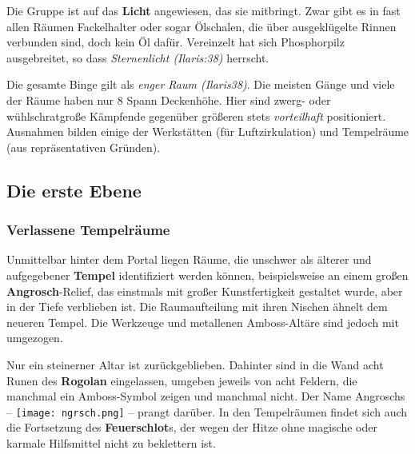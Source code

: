
\vfill

Die Gruppe ist auf das \textbf{Licht} angewiesen, das sie mitbringt.
Zwar gibt es in fast allen Räumen Fackelhalter oder sogar Ölschalen, die über ausgeklügelte Rinnen verbunden sind, doch kein Öl dafür.
Vereinzelt hat sich Phosphorpilz ausgebreitet, so dass \emph{Sternenlicht (Ilaris:38)} herrscht.

Die gesamte Binge gilt als \emph{enger Raum (Ilaris38)}.
Die meisten Gänge und viele der Räume haben nur 8 Spann Deckenhöhe.
Hier sind zwerg- oder wühlschratgroße Kämpfende gegenüber größeren stets \emph{vorteilhaft} positioniert.
Ausnahmen bilden einige der Werkstätten (für Luftzirkulation) und  Tempelräume (aus repräsentativen Gründen).

\neuespalte

\subsection{Die erste Ebene}

\subsubsection{Verlassene Tempelräume}
Unmittelbar hinter dem Portal liegen Räume, die unschwer als älterer und aufgegebener \textbf{Tempel} identifiziert werden können,
beispielsweise an einem großen \textbf{Angrosch}-Relief, das einstmals mit großer Kunstfertigkeit gestaltet wurde, aber in der Tiefe verblieben ist.
Die Raumaufteilung mit ihren Nischen ähnelt dem neueren Tempel.
Die Werkzeuge und metallenen Amboss-Altäre sind jedoch mit umgezogen.

Nur ein steinerner Altar ist zurückgeblieben. Dahinter sind in die Wand acht Runen des \textbf{Rogolan} eingelassen, umgeben jeweils von acht Feldern, die manchmal ein Amboss-Symbol zeigen und manchmal nicht.
Der Name Angroschs -- \texttt{[image: ngrsch.png]} --
prangt darüber.
In den Tempelräumen findet sich auch die Fortsetzung des \textbf{Feuerschlot}s, der wegen der Hitze ohne magische oder karmale Hilfsmittel nicht zu beklettern ist.

